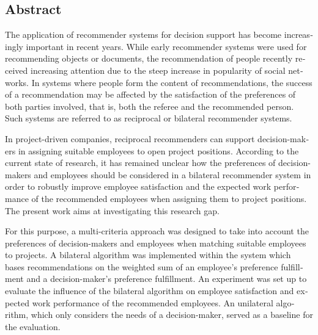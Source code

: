 
\begin{otherlanguage}{american}
	\chapter*{Abstract}
	

	The application of recommender systems for decision support has become increasingly important in recent years.
	While early recommender systems were used for recommending objects or documents, the recommendation of people recently received increasing attention due to the steep increase in popularity of social networks.
	In systems where people form the content of recommendations, the success of a recommendation may be affected by the satisfaction of the preferences of both parties involved, that is, both the referee and the recommended person.
	Such systems are referred to as reciprocal or bilateral recommender systems.
	
	In project-driven companies, reciprocal recommenders can support decision-makers in assigning suitable employees to open project positions.
	According to the current state of research, it has remained unclear how the preferences of decision-makers and employees should be considered in a bilateral recommender system in order to robustly improve employee satisfaction and the expected work performance of the recommended employees when assigning them to project positions.
	The present work aims at investigating this research gap.
	
	For this purpose, a multi-criteria approach was designed to take into account the preferences of decision-makers and employees when matching suitable employees to projects.
	A bilateral algorithm was implemented within the system which bases recommendations on the weighted sum of an employee's preference fulfillment and a decision-maker's preference fulfillment.
	An experiment was set up to evaluate the influence of the bilateral algorithm on employee satisfaction and expected work performance of the recommended employees.
	An unilateral algorithm, which only considers the needs of a decision-maker, served as a baseline for the evaluation.
	

\end{otherlanguage}
